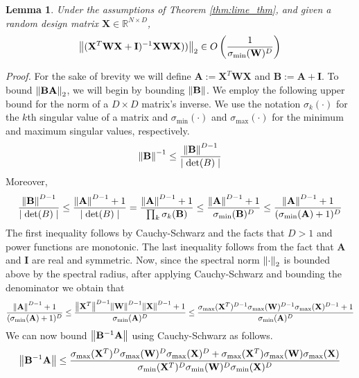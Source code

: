 \documentclass[12pt]{article}  %
\newcommand{\bA}{\mathbf{A}}
\newcommand{\bB}{\mathbf{B}}
\newcommand{\bX}{\mathbf{X}}
\newcommand{\bI}{\mathbf{I}}
\newcommand{\bW}{\mathbf{W}}
\newtheorem{lemma}[theorem]{Lemma}
\begin{document}
    \begin{lemma}
        \label{norm_bd}
        Under the assumptions of  Theorem \ref{thm:lime_thm}, and given a random  design matrix $\bX \in \mathbb{R}^{N\times D}$,
        \[\norm{(\bX^T \bW \bX + \bI)^{-1}\bX \bW \bX))}_2 \in O\left(\frac{1}{\sigma_{\min}(\bW)^D}\right) \]
    \end{lemma}
    
  \noindent \emph{Proof.} For the sake of brevity we will define $\bA := \bX^T \bW \bX$ and $\bB := \bA + \bI$. To bound $\norm{\bB \bA}_2$, we will begin by bounding $\norm{\bB}$. We employ the following upper bound for the norm of a $D \times D$ matrix's inverse. We use the notation $\sigma_k(\cdot)$ for the $k$th singular value of a matrix and $\sigma_{\min}(\cdot)$ and $\sigma_{\max}(\cdot)$ for the minimum and maximum singular values, respectively. 
  \begin{equation*}
      \norm{\bB}^{-1} \leq \frac{\norm{\bB}^{D-1}}{\mid \mathrm{det}(B)\mid}
  \end{equation*}
  Moreover,
  \begin{gather*}
      \frac{\norm{\bB}^{D-1}}{\mid \mathrm{det}(B)\mid} \leq \frac{\norm{\bA}^{D-1} + 1}{\mid \mathrm{det}(B)\mid} 
      =  \frac{\norm{\bA}^{D-1} + 1}{\prod_k \sigma_k(\bB)} 
      \leq \frac{\norm{\bA}^{D-1} + 1}{\sigma_{\min}(\bB)^D} 
      \leq  \frac{\norm{\bA}^{D-1} + 1}{(\sigma_{\min}(\bA) + 1)^D} 
  \end{gather*}
    The first inequality follows by Cauchy-Schwarz and the facts that  $D>1$ and power functions are monotonic. The last inequality follows from the fact that $\bA$ and $\bI$ are real and symmetric.
    Now, since the spectral norm $\norm{\cdot}_2$ is bounded above by the spectral radius, after applying Cauchy-Schwarz and bounding the denominator we obtain that
    \begin{gather*}
        \frac{\norm{\bA}^{D-1} + 1}{(\sigma_{\min}(\bA) + 1)^D} \leq \frac{\norm{\bX^T}^{D-1}\norm{\bW}^{D-1}\norm{\bX}^{D-1} + 1}{\sigma_{\min}(\bA)^D} \leq \frac{\sigma_{\max}(\bX^T)^{D-1}\sigma_{\max}(\bW)^{D-1}\sigma_{\max}(\bX)^{D-1} + 1}{\sigma_{\min}(\bA)^D}
    \end{gather*}
    We can now bound $\norm{\bB^{-1}\bA}$ using Cauchy-Schwarz as follows.
    \begin{equation*}
        \norm{\bB^{-1}\bA} \leq \frac{\sigma_{\max}(\bX^T)^{D}\sigma_{\max}(\bW)^{D}\sigma_{\max}(\bX)^{D} + \sigma_{\max}(\bX^T)\sigma_{\max}(\bW)\sigma_{\max}(\bX)}{\sigma_{\min}(\bX^T)^{D}\sigma_{\min}(\bW)^{D}\sigma_{\min}(\bX)^{D}}
    \end{equation*}
\end{document}
